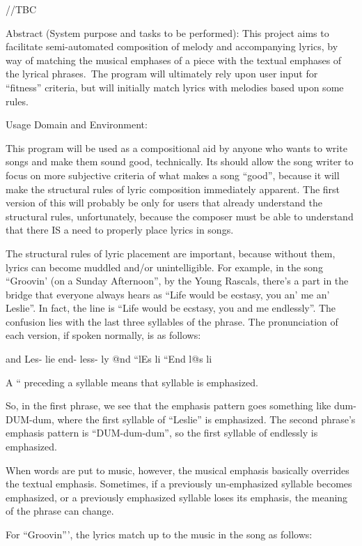 \documentclass[10pt,oneside]{memoir}
\begin{document}
//TBC


\pagebreak Abstract (System purpose and tasks to be performed):
This project aims to facilitate semi-automated composition of melody and accompanying lyrics, by way of matching the musical emphases of a piece with the textual emphases of the lyrical phrases.~The program will ultimately rely upon user input for ``fitness'' criteria, but will initially match lyrics with melodies based upon some rules.


Usage Domain and Environment:


This program will be used as a compositional aid by anyone who wants to write songs and make them sound good, technically.  Its should allow the song writer to focus on more subjective criteria of what makes a song ``good'', because it will make the structural rules of lyric composition immediately apparent.  The first version of this will probably be only for users that already understand the structural rules, unfortunately, because the composer must be able to understand that there IS a need to properly place lyrics in songs.  


The structural rules of lyric placement are important, because without them, lyrics can become muddled and/or unintelligible. For example, in the song ``Groovin' (on a Sunday Afternoon'', by the Young Rascals, there's a part in the bridge that everyone always hears as ``Life would be ecstasy, you an' me an' Leslie''.  In fact, the line is ``Life would be ecstasy, you and me endlessly''.  The confusion lies with the last three syllables of the phrase.  The pronunciation of each version, if spoken normally, is as follows:


and       Les-   lie
end-       less-       ly
@nd   ``lEs     li
``End      l@s       li


A `` preceding a syllable means that syllable is emphasized. 


So, in the first phrase, we see that the emphasis pattern goes something like dum-DUM-dum, where the first syllable of ``Leslie'' is emphasized.  The second phrase's emphasis pattern is ``DUM-dum-dum'', so the first syllable of endlessly is emphasized.


When words are put to music, however, the musical emphasis basically overrides the textual emphasis. Sometimes, if a previously un-emphasized syllable becomes emphasized, or a previously emphasized syllable loses its emphasis, the meaning of the phrase can change.


For ``Groovin''', the lyrics match up to the music in the song as follows:
\end{document}
